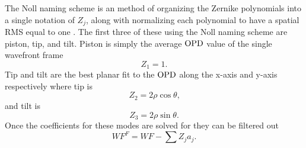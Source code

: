 The Noll naming scheme is an method of organizing the Zernike polynomials into a single notation of $Z_j$, along with normalizing each polynomial to have a spatial RMS equal to one \cite{Noll-1976-HHKzd88f}.
The first three of these using the Noll naming scheme are piston, tip, and tilt.
Piston is simply the average $\operatorname{OPD}$ value of the single wavefront frame
\begin{equation}
  Z_1 = 1 \textrm{.}
  \label{eqn:07_zernike_1}
\end{equation}
Tip and tilt are the best planar fit to the $\operatorname{OPD}$ along the x-axis and y-axis respectively where tip is
\begin{equation}
  Z_2 = 2\rho\cos\theta \textrm{,}
  \label{eqn:07_zernike_2}
\end{equation}
and tilt is
\begin{equation}
  Z_3 = 2\rho\sin\theta \textrm{.}
  \label{eqn:07_zernike_3}
\end{equation}
Once the coefficients for these modes are solved for they can be filtered out
\begin{equation}
  WF^F = WF-\sum Z_ja_j \textrm{.}
\end{equation}

